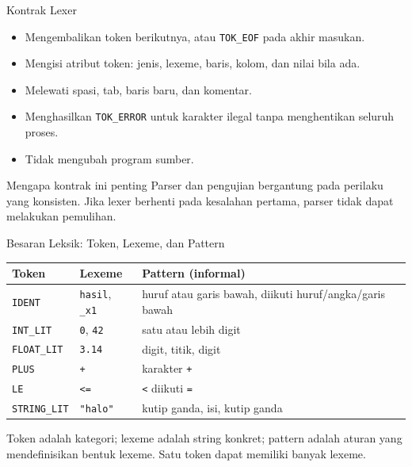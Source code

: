 \documentclass[aspectratio=169,10pt,t]{beamer}
\begin{document}
\begin{frame}{Kontrak Lexer}
  \begin{itemize}
    \item Mengembalikan token berikutnya, atau \texttt{TOK\_EOF} pada
          akhir masukan.
    \item Mengisi atribut token: jenis, lexeme, baris, kolom, dan nilai
          bila ada.
    \item Melewati spasi, tab, baris baru, dan komentar.
    \item Menghasilkan \texttt{TOK\_ERROR} untuk karakter ilegal tanpa
          menghentikan seluruh proses.
    \item Tidak mengubah program sumber.
  \end{itemize}

  \vspace{5pt}
  \begin{block}{Mengapa kontrak ini penting}
    \footnotesize
    Parser dan pengujian bergantung pada perilaku yang konsisten. Jika
    lexer berhenti pada kesalahan pertama, parser tidak dapat melakukan
    pemulihan.
  \end{block}
\end{frame}

\begin{frame}{Besaran Leksik: Token, Lexeme, dan Pattern}
  \small
  \setlength{\tabcolsep}{4pt}
  \begin{tabular}{@{}p{3.2cm}p{3.8cm}p{7.0cm}@{}}
    \toprule
    \textbf{Token} & \textbf{Lexeme} & \textbf{Pattern (informal)} \\
    \midrule
    \texttt{IDENT} & \texttt{hasil}, \texttt{\_x1} &
      huruf atau garis bawah, diikuti huruf/angka/garis bawah \\
    \texttt{INT\_LIT} & \texttt{0}, \texttt{42} &
      satu atau lebih digit \\
    \texttt{FLOAT\_LIT} & \texttt{3.14} & digit, titik, digit \\
    \texttt{PLUS} & \texttt{+} & karakter \texttt{+} \\
    \texttt{LE} & \texttt{<=} & \texttt{<} diikuti \texttt{=} \\
    \texttt{STRING\_LIT} & \texttt{"halo"} &
      kutip ganda, isi, kutip ganda \\
    \bottomrule
  \end{tabular}

  \vspace{5pt}
  {\footnotesize\color{ubbblue!80}Token adalah kategori; lexeme adalah
  string konkret; pattern adalah aturan yang mendefinisikan bentuk
  lexeme. Satu token dapat memiliki banyak lexeme.}
\end{frame}
\end{document}
